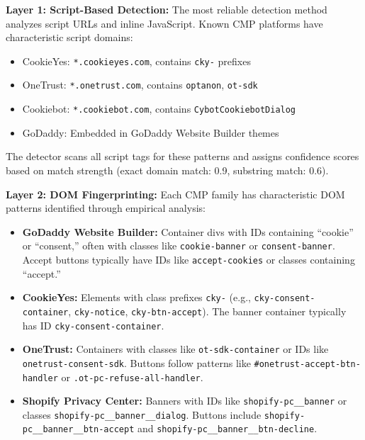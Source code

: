 \documentclass[conference]{IEEEtran}
\begin{document}
\textbf{Layer 1: Script-Based Detection:} The most reliable detection method analyzes script URLs and inline JavaScript. Known CMP platforms have characteristic script domains:

\begin{itemize}

    \item CookieYes: \texttt{*.cookieyes.com}, contains \texttt{cky-} prefixes

    \item OneTrust: \texttt{*.onetrust.com}, contains \texttt{optanon}, \texttt{ot-sdk}

    \item Cookiebot: \texttt{*.cookiebot.com}, contains \texttt{CybotCookiebotDialog}

    \item GoDaddy: Embedded in GoDaddy Website Builder themes

\end{itemize}

The detector scans all script tags for these patterns and assigns confidence scores based on match strength (exact domain match: 0.9, substring match: 0.6).

\textbf{Layer 2: DOM Fingerprinting:} Each CMP family has characteristic DOM patterns identified through empirical analysis:

\begin{itemize}

    \item \textbf{GoDaddy Website Builder:} Container divs with IDs containing ``cookie'' or ``consent,'' often with classes like \texttt{cookie-banner} or \texttt{consent-banner}. Accept buttons typically have IDs like \texttt{accept-cookies} or classes containing ``accept.''

    

    \item \textbf{CookieYes:} Elements with class prefixes \texttt{cky-} (e.g., \texttt{cky-consent-container}, \texttt{cky-notice}, \texttt{cky-btn-accept}). The banner container typically has ID \texttt{cky-consent-container}.

    

    \item \textbf{OneTrust:} Containers with classes like \texttt{ot-sdk-container} or IDs like \texttt{onetrust-consent-sdk}. Buttons follow patterns like \texttt{\#onetrust-accept-btn-handler} or \texttt{.ot-pc-refuse-all-handler}.

    

    \item \textbf{Shopify Privacy Center:} Banners with IDs like \texttt{shopify-pc\_\_banner} or classes \texttt{shopify-pc\_\_banner\_\_dialog}. Buttons include \texttt{shopify-pc\_\_banner\_\_btn-accept} and \texttt{shopify-pc\_\_banner\_\_btn-decline}.

\end{itemize}
\end{document}
